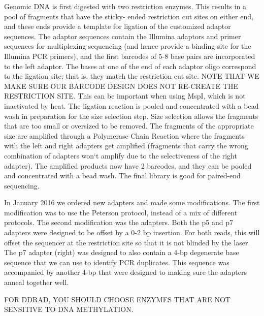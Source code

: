 \documentclass[11pt, oneside]{article}
\begin{document}
		\begin{adjustwidth}{0.5in}{0pt} Genomic DNA is first digested with two restriction enzymes. This results in a pool of fragments that have the sticky-		ended restriction cut sites on either end, and these ends provide a template for ligation of the customized adaptor sequences. The adaptor 			sequences contain the Illumina adaptors and primer sequences for multiplexing sequencing (and hence provide a binding site for the Illumina PCR 		primers), and the first barcodes of 5-8 base pairs are incorporated to the left adaptor. The bases at one of the end of each adaptor oligo correspond to the ligation site; that is, they match the restriction cut site.  NOTE THAT WE MAKE SURE OUR BARCODE DESIGN DOES NOT RE-CREATE THE RESTRICTION SITE.  This can be important when using MspI, which is not inactivated by heat. The ligation reaction is pooled and concentrated with a bead wash in preparation for the size selection step. Size selection allows the fragments that are too small or oversized to be removed. The fragments of the appropriate size are 	amplified through a Polymerase Chain Reaction where the fragments with the left and right adapters get amplified (fragments that carry the wrong combination of adapters won`t amplify due to the selectiveness of the right adapter). The amplified products now have 2 barcodes, and they can be pooled and concentrated with a bead wash. The final library is good for paired-end sequencing. 
		
		In January 2016 we ordered new adapters and made some modifications.  The first modification was to use the Peterson protocol, instead of a mix of different protocols.  The second modification was the adapters.  Both the p5 and p7 adapters were designed to be offset by a 0-2 bp insertion.  For both reads, this will offset the sequencer at the restriction site so that it is not blinded by the laser. The p7 adapter (right) was designed to also contain a 4-bp degenerate base sequence that we can use to identify PCR duplicates.  This sequence was accompanied by another 4-bp that were designed to making sure the adapters anneal together well.
		
		FOR DDRAD, YOU SHOULD CHOOSE ENZYMES THAT ARE NOT SENSITIVE TO DNA METHYLATION.
		
		\end{adjustwidth}
\end{document}

